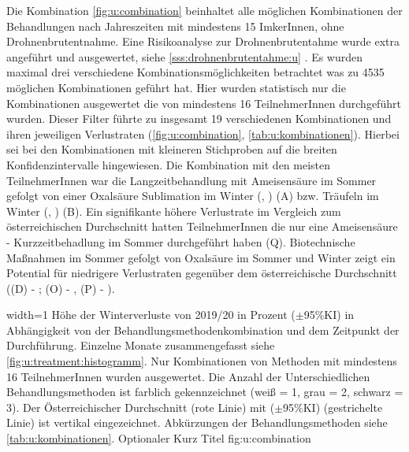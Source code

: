 Die Kombination \cref{fig:u:combination} beinhaltet alle möglichen Kombinationen der Behandlungen nach Jahreszeiten mit mindestens 15 ImkerInnen, ohne Drohnenbrutentnahme. Eine Risikoanalyse zur Drohnenbrutentahme wurde extra angeführt und ausgewertet, siehe \ref{sss:drohnenbrutentahme:u} . Es wurden maximal drei verschiedene Kombinationsmöglichkeiten betrachtet was zu 4535 möglichen Kombinationen geführt hat. Hier wurden statistisch nur die Kombinationen ausgewertet die von mindestens 16 TeilnehmerInnen durchgeführt wurden. Dieser Filter führte zu insgesamt 19 verschiedenen Kombinationen und ihren jeweiligen Verlustraten (\cref{fig:u:combination}, \cref{tab:u:kombinationen}). Hierbei sei bei den Kombinationen mit kleineren Stichproben auf die breiten Konfidenzintervalle hingewiesen.
\newline
Die Kombination mit den meisten TeilnehmerInnen war die Langzeitbehandlung mit Ameisensäure im Sommer gefolgt von einer Oxalsäure Sublimation im Winter (, ) (A) bzw. Träufeln im Winter (, ) (B). Ein signifikante höhere Verlustrate im Vergleich zum österreichischen Durchschnitt hatten TeilnehmerInnen die nur eine Ameisensäure - Kurzzeitbehadlung im Sommer durchgeführt haben  (Q). 
\newline
Biotechnische Maßnahmen im Sommer gefolgt von Oxalsäure im Sommer und Winter zeigt ein Potential für niedrigere Verlustraten gegenüber dem österreichische Durchschnitt ((D) - ; (O) - , (P) - ).

{width=1\textwidth} %
{Höhe der Winterverluste von 2019/20 in Prozent ($\pm$95\%KI) in Abhängigkeit von der Behandlungsmethodenkombination und dem Zeitpunkt der Durchführung. Einzelne Monate zusammengefasst siehe \cref{fig:u:treatment:histogramm}. Nur Kombinationen von Methoden mit mindestens 16 TeilnehmerInnen wurden ausgewertet. Die Anzahl der Unterschiedlichen Behandlungsmethoden ist farblich gekennzeichnet (weiß = 1, grau = 2, schwarz = 3). Der Österreichischer Durchschnitt (rote Linie) mit ($\pm$95\%KI) (gestrichelte Linie) ist vertikal eingezeichnet. Abkürzungen der Behandlungsmethoden siehe \cref{tab:u:kombinationen}.} %
{Optionaler Kurz Titel} %
{fig:u:combination} %

